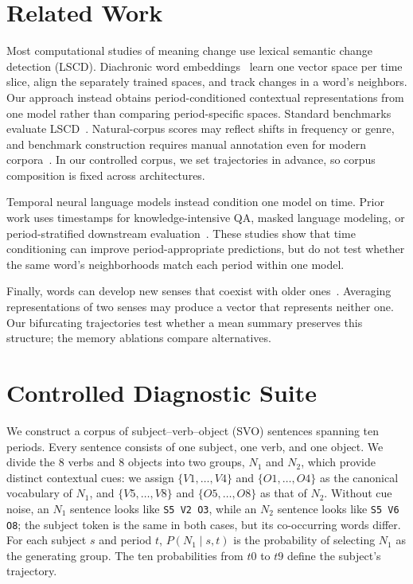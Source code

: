 \documentclass[runningheads]{llncs}
\begin{document}
\section{Related Work}
Most computational studies of meaning change use lexical semantic change
detection (LSCD). Diachronic word embeddings~\cite{hamilton2016diachronic}
learn one vector space per time slice, align the separately trained spaces, and
track changes in a word's neighbors. Our approach instead obtains
period-conditioned contextual representations from one model rather than
comparing period-specific spaces.
Standard benchmarks evaluate LSCD~\cite{schlechtweg2020semeval,tahmasebi2021survey}.
Natural-corpus scores may reflect shifts in frequency or genre, and benchmark
construction requires manual annotation even for modern
corpora~\cite{zamora2022lscdiscovery}. In our controlled corpus, we set
trajectories in advance, so corpus composition is fixed across architectures.

Temporal neural language models instead condition one model on time. Prior work
uses timestamps for knowledge-intensive QA, masked language
modeling, or period-stratified downstream
evaluation~\cite{dhingra2022timeaware,rosin2022timemasking,loureiro2022timelms}.
These studies show that time conditioning can improve period-appropriate
predictions, but do not test whether the same word's neighborhoods match each
period within one model.

Finally, words can develop new senses that coexist with older
ones~\cite{giulianelli2020analysing}. Averaging representations of two senses may
produce a vector that represents neither one. Our bifurcating trajectories test
whether a mean summary preserves this structure; the memory ablations compare
alternatives.

\section{Controlled Diagnostic Suite}
We construct a corpus of subject--verb--object (SVO) sentences spanning ten
periods. Every sentence consists of one subject, one verb, and one object. We
divide the 8 verbs and 8 objects
into two groups, $N_1$ and $N_2$, which provide distinct contextual cues:
we assign \(\{V1,\ldots,V4\}\) and \(\{O1,\ldots,O4\}\) as the canonical
vocabulary of $N_1$, and \(\{V5,\ldots,V8\}\) and \(\{O5,\ldots,O8\}\) as that
of $N_2$. Without cue noise, an $N_1$ sentence looks like
\texttt{S5 V2 O3}, while an $N_2$ sentence looks like \texttt{S5 V6 O8}; the
subject token is the same in both cases, but its co-occurring words differ. For
each subject $s$ and period $t$, \(P(N_1 \mid s,t)\) is the probability of
selecting $N_1$ as the generating group. The ten probabilities from \(t0\) to
\(t9\) define the subject's trajectory.
\end{document}
